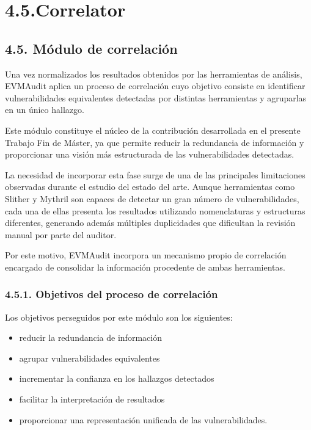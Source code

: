 \section{4.5.Correlator}\label{correlator}

\subsection{4.5. Módulo de
correlación}\label{muxf3dulo-de-correlaciuxf3n}

Una vez normalizados los resultados obtenidos por las herramientas de
análisis, EVMAudit aplica un proceso de correlación cuyo objetivo
consiste en identificar vulnerabilidades equivalentes detectadas por
distintas herramientas y agruparlas en un único hallazgo.

Este módulo constituye el núcleo de la contribución desarrollada en el
presente Trabajo Fin de Máster, ya que permite reducir la redundancia de
información y proporcionar una visión más estructurada de las
vulnerabilidades detectadas.

La necesidad de incorporar esta fase surge de una de las principales
limitaciones observadas durante el estudio del estado del arte. Aunque
herramientas como Slither y Mythril son capaces de detectar un gran
número de vulnerabilidades, cada una de ellas presenta los resultados
utilizando nomenclaturas y estructuras diferentes, generando además
múltiples duplicidades que dificultan la revisión manual por parte del
auditor.

Por este motivo, EVMAudit incorpora un mecanismo propio de correlación
encargado de consolidar la información procedente de ambas herramientas.

\subsubsection{4.5.1. Objetivos del proceso de
correlación}\label{objetivos-del-proceso-de-correlaciuxf3n}

Los objetivos perseguidos por este módulo son los siguientes:

\begin{itemize}
\tightlist
\item
  reducir la redundancia de información
\item
  agrupar vulnerabilidades equivalentes
\item
  incrementar la confianza en los hallazgos detectados
\item
  facilitar la interpretación de resultados
\item
  proporcionar una representación unificada de las vulnerabilidades.
\end{itemize}

